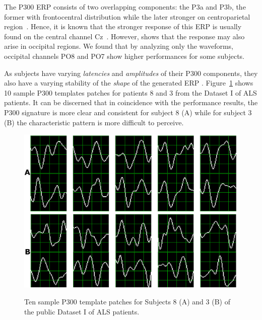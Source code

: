 The P300 ERP  consists of two overlapping components: the P3a and P3b, the former with frontocentral distribution while the later stronger on centroparietal region~\cite{Polich2007}. Hence, it is known that the stronger response of this ERP is usually found on the central channel Cz~\cite{Riccio2013}. However, \cite{Krusienski2006} shows that the response may also arise in occipital regions.  We found that by analyzing only the waveforms, occipital channels PO8 and PO7 show higher performances for some subjects. 


As subjects have varying \textit{latencies} and \textit{amplitudes} of their P300 components, they also have a varying stability of the \textit{shape} of the generated ERP \cite{Nam2010}.  Figure~\ref{fig:p300templates} shows 10 sample P300 templates patches for patients 8 and 3 from the Dataset I of ALS patients. It can be discerned that in coincidence with the performance results, the P300 signature is more clear and consistent for subject 8 (A) while for subject 3 (B) the characteristic pattern is more difficult to perceive.


\begin{figure}[h!]
\centering
\includegraphics[width=15cm]{images/subject.png}\label{subject8}
\caption[Sample P300 Patches]{Ten sample P300 template patches for Subjects 8 (A) and 3 (B) of the public Dataset I of ALS patients.}  %
\label{fig:p300templates}
\end{figure}


